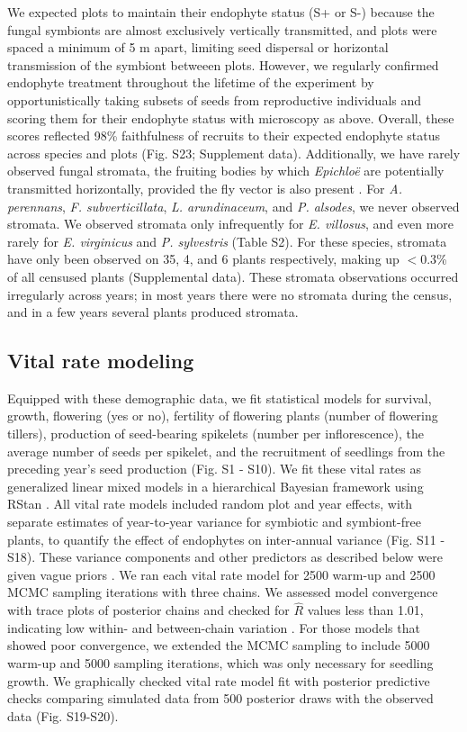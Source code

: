 \documentclass[9pt,twocolumn,twoside]{pnas-new}
\begin{document}
{We expected plots to maintain their endophyte status (S+ or S-) because the fungal symbionts are almost exclusively vertically transmitted, and plots were spaced a minimum of 5 m apart, limiting seed dispersal or horizontal transmission of the symbiont betweeen plots. 
However, we regularly confirmed endophyte treatment throughout the lifetime of the experiment by opportunistically taking subsets of seeds from reproductive individuals and scoring them for their endophyte status with microscopy as above.
Overall, these scores reflected 98\% faithfulness of recruits to their expected endophyte status across species and plots (Fig. S23; Supplement data). 
Additionally, we have rarely observed fungal stromata, the fruiting bodies by which \emph{Epichlo\"e} are potentially transmitted horizontally, provided the fly vector is also present \cite{bultman1995mutualistic}. 
For \emph{A. perennans}, \emph{F. subverticillata}, \emph{L. arundinaceum}, and \emph{P. alsodes}, we never observed stromata. 
We observed stromata only infrequently for \emph{E. villosus}, and even more rarely for \emph{E. virginicus} and \emph{P. sylvestris} (Table S2). 
For these species, stromata have only been observed on 35, 4, and 6 plants respectively, making up $< 0.3$\% of all censused plants (Supplemental data).
These stromata observations occurred irregularly across years; in most years there were no stromata during the census, and in a few years several plants produced stromata. 

\subsection*{Vital rate modeling}
Equipped with these demographic data, we fit statistical models for survival, growth, flowering (yes or no), fertility of flowering plants (number of flowering tillers), production of seed-bearing spikelets (number per inflorescence), the average number of seeds per spikelet, and the recruitment of seedlings from the preceding year's seed production (Fig. S1 - S10).  
We fit these vital rates as generalized linear mixed models in a hierarchical Bayesian framework using RStan \cite{rstan2022}. 
All vital rate models included random plot and year effects, with separate estimates of year-to-year variance for symbiotic and symbiont-free plants, to quantify the effect of endophytes on inter-annual variance (Fig. S11 - S18). 
These variance components and other predictors as described below were given vague priors \cite{gabry2019visualization}.
We ran each vital rate model for 2500 warm-up and 2500 MCMC sampling iterations with three chains. 
We assessed model convergence with trace plots of posterior chains and checked for $\hat{R}$ values less than 1.01, indicating low within- and between-chain variation \cite{brooks1998general,gelman2006data}. 
For those models that showed poor convergence, we extended the MCMC sampling to include 5000 warm-up and 5000 sampling iterations, which was only necessary for seedling growth. 
We graphically checked vital rate model fit with posterior predictive checks comparing simulated data from 500 posterior draws with the observed data (Fig. S19-S20).

}
\end{document}

